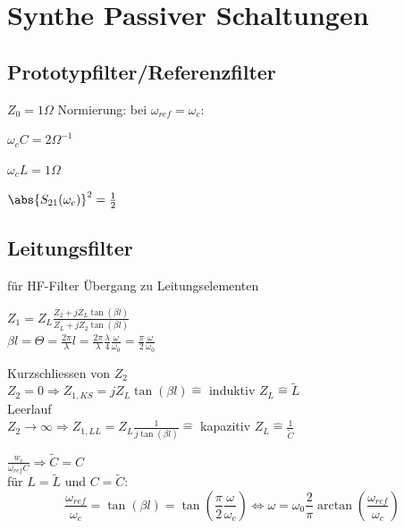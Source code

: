 \section{Synthe Passiver Schaltungen}
\renewcommand{\ort}{topics/SPSchaltungen}


\subsection{Prototypfilter/Referenzfilter}

$Z_0 = 1 \Omega$
Normierung: bei $\omega_{ref} = \omega_c$:
\begin{pitemize}
    \item $\omega_c C = 2\Omega^{-1}$
    \item $\omega_c L = 1\Omega$
\end{pitemize}

$\abs{S_{21}(\omega_c)}^2 = \frac{1}{2}$


\subsection{Leitungsfilter}
für HF-Filter Übergang zu Leitungselementen


$Z_1 = Z_L \frac{Z_2 + jZ_L \tan(\beta l)}{Z_L + j Z_2\tan(\beta l)}$\\
$\beta l = \Theta = \frac{2\pi}{\lambda} l = \frac{2\pi}{\lambda} \frac{\lambda}{4} \frac{\omega}{\omega_0} = \frac{\pi}{2} \frac{\omega}{\omega_0}$

 Kurzschliessen von $Z_2$ \\

$Z_2 = 0 \Rightarrow Z_{1,KS} = jZ_L \tan(\beta l) \hat{=}$ induktiv
$Z_L \hat{=} \tilde{L}$ \\
 Leerlauf \\

$Z_2 \rightarrow \infty \Rightarrow Z_{1,LL} = Z_L \frac{1}{j\tan(\beta l)} \hat{=}$ kapazitiv
$Z_L \hat{=} \frac{1}{\tilde{C}}$ 

$\frac{w_c}{\omega_{ref} C} \Rightarrow \tilde{C} = C$\\

für $L = \tilde{L}$ und $C = \tilde{C}$:\\
\begin{equation}
\frac{\omega_{ref}}{\omega_c} = \tan(\beta l) = \tan(\frac{\pi}{2}\frac{\omega}{\omega_c})
\Leftrightarrow \omega = \omega_0 \frac{2}{\pi} \arctan(\frac{\omega_{ref}}{\omega_c})
\end{equation}

